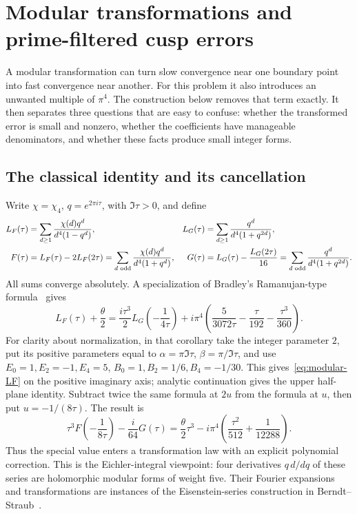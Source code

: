 \section{Modular transformations and prime-filtered cusp errors}
\label{sec:modular-case}
A modular transformation can turn slow convergence near one boundary
point into fast convergence near another. For this problem it also
introduces an unwanted multiple of $\pi^4$. The construction below
removes that term exactly. It then separates three questions that are
easy to confuse: whether the transformed error is small and nonzero,
whether the coefficients have manageable denominators, and whether
these facts produce small integer forms.

\subsection{The classical identity and its cancellation}
Write $\chi=\chi_4$, $q=e^{2\pi i\tau}$, with $\Im\tau>0$, and define
\begin{align}
 L_F(\tau)&=\sum_{d\geq1}\frac{\chi(d)q^d}{d^4(1-q^d)},&
 L_G(\tau)&=\sum_{d\geq1}\frac{q^d}{d^4(1+q^{2d})},\notag\\
 F(\tau)&=L_F(\tau)-2L_F(2\tau)
       =\sum_{d\text{ odd}}\frac{\chi(d)q^d}{d^4(1+q^d)},&
 G(\tau)&=L_G(\tau)-\frac{L_G(2\tau)}{16}
       =\sum_{d\text{ odd}}\frac{q^d}{d^4(1+q^{2d})}.
 \label{eq:modular-series}
\end{align}
All sums converge absolutely. A specialization of Bradley's
Ramanujan-type formula~\cite[Corollary 4]{Bradley} gives
\begin{equation}\label{eq:modular-LF}
 L_F(\tau)+\frac\theta2
 =\frac{i\tau^3}{2}L_G\left(-\frac1{4\tau}\right)
   +i\pi^4\left(\frac5{3072\tau}-\frac\tau{192}
                                  -\frac{\tau^3}{360}\right).
\end{equation}
For clarity about normalization, in that corollary take the integer
parameter $2$, put its positive parameters equal to
$\alpha=\pi\Im\tau$, $\beta=\pi/\Im\tau$, and use
$E_0=1,E_2=-1,E_4=5$, $B_0=1,B_2=1/6,B_4=-1/30$.
This gives~\eqref{eq:modular-LF} on the positive imaginary axis;
analytic continuation gives the upper half-plane identity.
Subtract twice the same formula at $2u$ from the formula at $u$,
then put $u=-1/(8\tau)$. The result is
\begin{equation}\label{eq:modular-fricke}
 \tau^3F\left(-\frac1{8\tau}\right)-\frac{i}{64}G(\tau)
 =\frac\theta2\tau^3-i\pi^4
                \left(\frac{\tau^2}{512}+\frac1{12288}\right).
\end{equation}
Thus the special value enters a transformation law with an explicit
polynomial correction. This is the Eichler-integral viewpoint:
four derivatives $q\,d/dq$ of these series are holomorphic modular
forms of weight five. Their Fourier expansions and transformations
are instances of the Eisenstein-series construction in
Berndt--Straub~\cite[Section 4 and Example 6.4]{BerndtStraub}.

